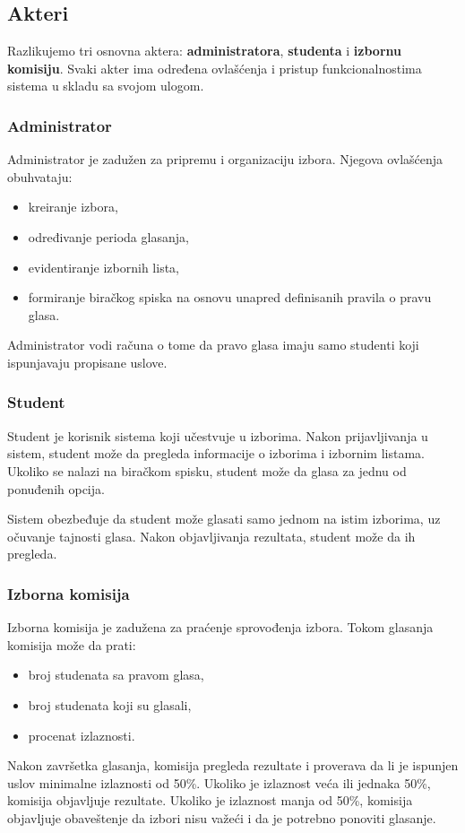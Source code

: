 \documentclass[12pt,a4paper]{article}
\begin{document}
\subsection{Akteri}

Razlikujemo tri osnovna aktera: \textbf{administratora}, \textbf{studenta} i \textbf{izbornu komisiju}. Svaki akter ima određena ovlašćenja i pristup funkcionalnostima sistema u skladu sa svojom ulogom.

\subsubsection*{Administrator}

Administrator je zadužen za pripremu i organizaciju izbora. Njegova ovlašćenja obuhvataju:
\begin{itemize}
    \item kreiranje izbora,
    \item određivanje perioda glasanja,
    \item evidentiranje izbornih lista,
    \item formiranje biračkog spiska na osnovu unapred definisanih pravila o pravu glasa.
\end{itemize}
Administrator vodi računa o tome da pravo glasa imaju samo studenti koji ispunjavaju propisane uslove.

\subsubsection*{Student}

Student je korisnik sistema koji učestvuje u izborima. Nakon prijavljivanja u sistem, student može da pregleda informacije o izborima i izbornim listama. Ukoliko se nalazi na biračkom spisku, student može da glasa za jednu od ponuđenih opcija.

Sistem obezbeđuje da student može glasati samo jednom na istim izborima, uz očuvanje tajnosti glasa. Nakon objavljivanja rezultata, student može da ih pregleda.

\subsubsection*{Izborna komisija}

Izborna komisija je zadužena za praćenje sprovođenja izbora. Tokom glasanja komisija može da prati:
\begin{itemize}
    \item broj studenata sa pravom glasa,
    \item broj studenata koji su glasali,
    \item procenat izlaznosti.
\end{itemize}
Nakon završetka glasanja, komisija pregleda rezultate i proverava da li je ispunjen uslov minimalne izlaznosti od 50\%. Ukoliko je izlaznost veća ili jednaka 50\%, komisija objavljuje rezultate. Ukoliko je izlaznost manja od 50\%, komisija objavljuje obaveštenje da izbori nisu važeći i da je potrebno ponoviti glasanje.
\end{document}

